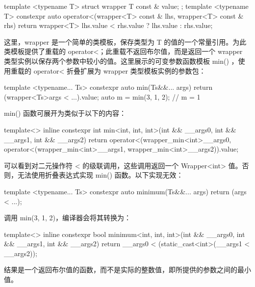 \begin{cpp}
template <typename T>
struct wrapper
{
    T const & value;
};
template <typename T>
constexpr auto operator<(wrapper<T> const & lhs, wrapper<T> const & rhs)
{
    return wrapper<T> {lhs.value < rhs.value ? lhs.value : rhs.value};
}
\end{cpp}

这里，wrapper 是一个简单的类模板，保存类型为 T 的值的一个常量引用。为此类模板提供了重载的 operator<；此重载不返回布尔值，而是返回一个 wrapper 类型实例以保存两个参数中较小的值。这里展示的可变参数函数模板 min() ，使用重载的 operator< 折叠扩展为 wrapper 类型模板实例的参数包：

\begin{cpp}
template <typename... Ts>
constexpr auto min(Ts&&... args)
{
    return (wrapper<Ts>{args} < ...).value;
}
auto m = min(3, 1, 2); // m = 1
\end{cpp}

min() 函数可展开为类似于以下的内容：

\begin{cpp}
template<>
inline constexpr int min<int, int, int>(int && __args0,
                                        int && __args1,
                                        int && __args2)
{
    return
    operator<(wrapper_min<int>{__args0},
        operator<(wrapper_min<int>{__args1},
            wrapper_min<int>{__args2})).value;
}
\end{cpp}

可以看到对二元操作符 < 的级联调用，这些调用返回一个 Wrapper<int> 值。否则，无法使用折叠表达式实现 min() 函数。以下实现无效：

\begin{cpp}
template <typename... Ts>
constexpr auto minimum(Ts&&... args)
{
    return (args < ...);
}
\end{cpp}

调用 min(3, 1, 2)，编译器会将其转换为：

\begin{cpp}
template<>
inline constexpr bool minimum<int, int, int>(int && __args0,
                                             int && __args1,
                                             int && __args2)
{
    return __args0 < (static_cast<int>(__args1 < __args2));
}
\end{cpp}

结果是一个返回布尔值的函数，而不是实际的整数值，即所提供的参数之间的最小值。
